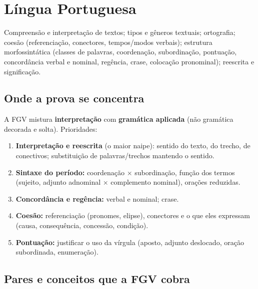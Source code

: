 \chapter{Língua Portuguesa}
\label{cap:portugues}

\begin{edital}
Compreensão e interpretação de textos; tipos e gêneros textuais; ortografia;
coesão (referenciação, conectores, tempos/modos verbais); estrutura
morfossintática (classes de palavras, coordenação, subordinação, pontuação,
concordância verbal e nominal, regência, crase, colocação pronominal);
reescrita e significação.
\end{edital}

\section{Onde a prova se concentra}

A FGV mistura \textbf{interpretação} com \textbf{gramática aplicada} (não
gramática decorada e solta). Prioridades:

\begin{enumerate}
\item \textbf{Interpretação e reescrita} (o maior naipe): sentido do texto,
do trecho, de conectivos; substituição de palavras/trechos mantendo o
sentido.
\item \textbf{Sintaxe do período:} coordenação $\times$ subordinação, função
dos termos (sujeito, adjunto adnominal $\times$ complemento nominal), orações
reduzidas.
\item \textbf{Concordância e regência:} verbal e nominal; crase.
\item \textbf{Coesão:} referenciação (pronomes, elipse), conectores e o que
eles expressam (causa, consequência, concessão, condição).
\item \textbf{Pontuação:} justificar o uso da vírgula (aposto, adjunto
deslocado, oração subordinada, enumeração).
\end{enumerate}

\section{Pares e conceitos que a FGV cobra}

